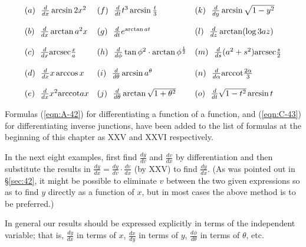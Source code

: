 \begin{enumerate}
\[
\begin{array}{lll}
(a)\ \  \frac{d}{dx} \arcsin 2x^2  &   	(f)\ \  \frac{d}{dt} t^3 \arcsin \frac{t}{3}  &   	(k)\ \  \frac{d}{dy} \arcsin \sqrt{1 - y^2}\\
 & & \\
(b)\ \  \frac{d}{dx} \arctan a^2x  &   	(g)\ \  \frac{d}{dt} e^{\arctan at}  &   	(l)\ \  \frac{d}{dz} \arctan ( \log 3 az )\\
 & & \\
(c)\ \  \frac{d}{dx} \arcsec \frac{x}{a}  &   	(h)\ \  \frac{d}{d\phi} \tan \phi^2 \cdot \arctan \phi^{\frac{1}{2}}  &   	(m)\ \  \frac{d}{ds}(a^2 + s^2)\arcsec \frac{s}{2}\\
 & & \\
(d)\ \  \frac{d}{dx} x \arccos x  &   	(i)\ \  \frac{d}{d\theta} \arcsin a^{\theta}  &   	(n)\ \  \frac{d}{d\alpha} \arccot \frac{2\alpha}{3}\\
 & & \\
(e)\ \  \frac{d}{dx} x^2 \arccot ax  &   	(j)\ \  \frac{d}{d\theta} \arctan \sqrt{1 + \theta^2}  &   	(o)\ \  \frac{d}{dt} \sqrt{1 - t^2} \arcsin t
\end{array}
\]

\end{enumerate}

Formulas (\ref{eqn:A-42}) %
for differentiating a function of a function, and (\ref{eqn:C-43}) %
for differentiating inverse junctions, have been added to the list of 
formulas at the beginning of this chapter as XXV and XXVI respectively.

In the next eight examples, first find $\frac{dy}{dv}$ and $\frac{dv}{dx}$ by 
differentiation and then substitute the results in
$\frac{dy}{dx} 	= \frac{dy}{dv} \cdot \frac{dv}{dx}$ (by XXV)
to find $\frac{dy}{dx}$. (As was pointed out in \S \ref{sec:42}, %
it might be possible to eliminate $v$ between the two given expressions so 
as to find $y$ directly as a function of $x$, but in most cases the above method is to be preferred.)

In general our results should be expressed explicitly in terms of the 
independent variable; that is, $\frac{dy}{dx}$ in terms of $x$, 
$\frac{dx}{dy}$ in terms of $y$, $\frac{d\phi}{d\theta}$ in terms of $\theta$, etc.

